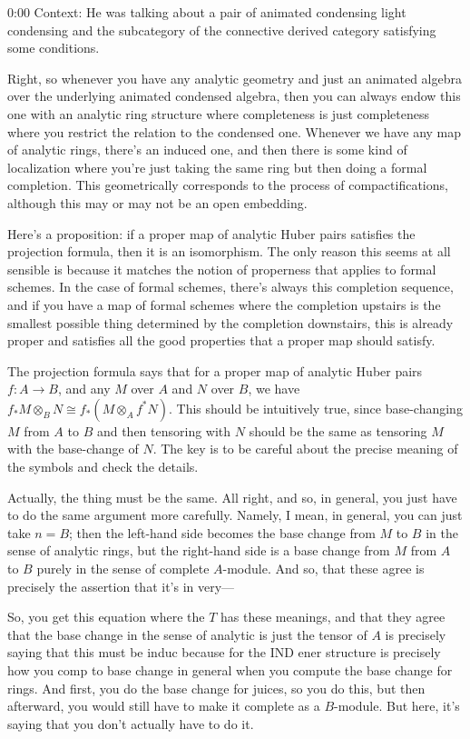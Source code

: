 \begin{unfinished}{0:00}
Context: He was talking about a pair of animated condensing light condensing and the subcategory of the connective derived category satisfying some conditions. 

Right, so whenever you have any analytic geometry and just an animated algebra over the underlying animated condensed algebra, then you can always endow this one with an analytic ring structure where completeness is just completeness where you restrict the relation to the condensed one. Whenever we have any map of analytic rings, there's an induced one, and then there is some kind of localization where you're just taking the same ring but then doing a formal completion. This geometrically corresponds to the process of compactifications, although this may or may not be an open embedding.

Here's a proposition: if a proper map of analytic Huber pairs satisfies the projection formula, then it is an isomorphism. The only reason this seems at all sensible is because it matches the notion of properness that applies to formal schemes. In the case of formal schemes, there's always this completion sequence, and if you have a map of formal schemes where the completion upstairs is the smallest possible thing determined by the completion downstairs, this is already proper and satisfies all the good properties that a proper map should satisfy.

The projection formula says that for a proper map of analytic Huber pairs $f: A \to B$, and any $M$ over $A$ and $N$ over $B$, we have $f_*M \otimes_B N \cong f_*(M \otimes_A f^*N)$. This should be intuitively true, since base-changing $M$ from $A$ to $B$ and then tensoring with $N$ should be the same as tensoring $M$ with the base-change of $N$. The key is to be careful about the precise meaning of the symbols and check the details.


Actually, the thing must be the same. All right, and so, in general, you just have to do the same argument more carefully. Namely, I mean, in general, you can just take $n = B$; then the left-hand side becomes the base change from $M$ to $B$ in the sense of analytic rings, but the right-hand side is a base change from $M$ from $A$ to $B$ purely in the sense of complete $A$-module. And so, that these agree is precisely the assertion that it's in very---

So, you get this equation where the $T$ has these meanings, and that they agree that the base change in the sense of analytic is just the tensor of $A$ is precisely saying that this must be induc because for the IND ener structure is precisely how you comp to base change in general when you compute the base change for rings. And first, you do the base change for juices, so you do this, but then afterward, you would still have to make it complete as a $B$-module. But here, it's saying that you don't actually have to do it.


\end{unfinished}
